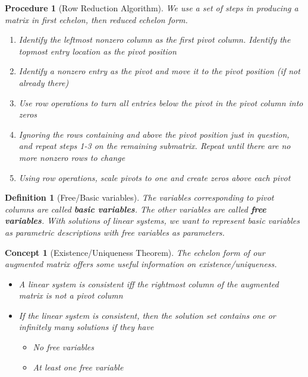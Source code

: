 \documentclass[12pt]{report}
\newtheorem{dfn}{Definition}
\newtheorem{cpt}{Concept}
\newtheorem{proc}{Procedure}
\begin{document}
\begin{proc}[Row Reduction Algorithm]

We use a set of steps in producing a matrix in first echelon, then reduced echelon form.

\begin{enumerate}

\item Identify the leftmost nonzero column as the first pivot column. Identify the topmost entry location as the pivot position
\item Identify a nonzero entry as the pivot and move it to the pivot position (if not already there)
\item Use row operations to turn all entries below the pivot in the pivot column into zeros
\item Ignoring the rows containing and above the pivot position just in question, and repeat steps 1-3 on the remaining submatrix. Repeat until there are no more nonzero rows to change


\item Using row operations, scale pivots to one and create zeros above each pivot


\end{enumerate}
\end{proc}

\begin{dfn}[Free/Basic variables]

The variables corresponding to pivot columns are called \textbf{basic variables}. The other variables are called \textbf{free variables}. With solutions of linear systems, we want to represent basic variables as parametric descriptions with free variables as parameters.

\end{dfn}

\begin{cpt}[Existence/Uniqueness Theorem]

The echelon form of our augmented matrix offers some useful information on existence/uniqueness.

\begin{itemize}
\item[Existence] A linear system is consistent iff the rightmost column of the augmented matrix is not a pivot column
\item[Uniqueness] If the linear system is consistent, then the solution set contains one or infinitely many solutions if they have 
\begin{itemize}
\item[One] No free variables
\item[Infinite] At least one free variable
\end{itemize}
\end{itemize}
\end{cpt}
\end{document}
